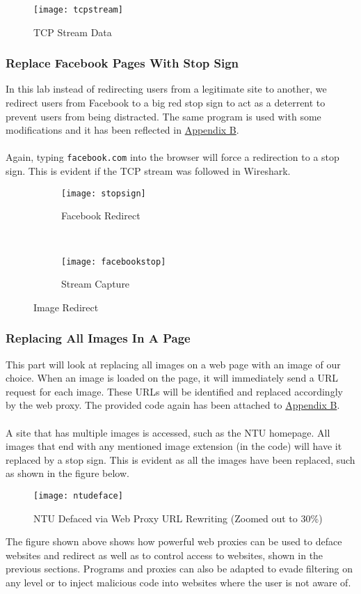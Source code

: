 \documentclass[a4paper,12pt]{article}
\begin{document}
\begin{figure}[H]
\centering
\texttt{[image: tcpstream]}
\caption{TCP Stream Data}
\label{fig:tcpstream}
\end{figure}
\subsubsection{Replace Facebook Pages With Stop Sign}
In this lab instead of redirecting users from a legitimate site to another, we redirect users from Facebook to a big red stop sign to act as a deterrent to prevent users from being distracted. The same program is used with some modifications and it has been reflected in \hyperref[ch:AppBStop]{Appendix B}.\\\\Again, typing \texttt{facebook.com} into the browser will force a redirection to a stop sign. This is evident if the TCP stream was followed in Wireshark.

\begin{figure}[H]
\centering
\begin{subfigure}{0.48\textwidth}
\centering
\texttt{[image: stopsign]}
\caption{Facebook Redirect}
\label{fig:stopsign}
\end{subfigure}
~
\begin{subfigure}{0.48\textwidth}
\centering
\texttt{[image: facebookstop]}
\caption{Stream Capture}
\label{fig:facebookstop}
\end{subfigure}
\caption{Image Redirect}
\end{figure}
\subsubsection{Replacing All Images In A Page}
This part will look at replacing all images on a web page with an image of our choice. When an image is loaded on the page, it will immediately send a URL request for each image. These URLs will be identified and replaced accordingly by the web proxy. The provided code again has been attached to \hyperref[ch:AppBImgMod]{Appendix B}.\\\\A site that has multiple images is accessed, such as the NTU homepage. All images that end with any mentioned image extension (in the code) will have it replaced by a stop sign. This is evident as all the images have been replaced, such as shown in the figure below.
\begin{figure}[H]
\centering
\texttt{[image: ntudeface]}
\caption{NTU Defaced via Web Proxy URL Rewriting (Zoomed out to 30\%)}
\label{fig:ntudeface}
\end{figure}
\noindent The figure shown above shows how powerful web proxies can be used to deface websites and redirect as well as to control access to websites, shown in the previous sections. Programs and proxies can also be adapted to evade filtering on any level or to inject malicious code into websites where the user is not aware of.
\end{document}
